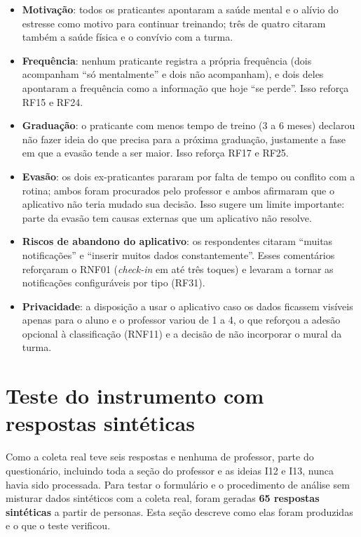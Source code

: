 \begin{itemize}
  \item \textbf{Motivação}: todos os praticantes apontaram a saúde mental
        e o alívio do estresse como motivo para continuar treinando; três
        de quatro citaram também a saúde física e o convívio com a turma.
  \item \textbf{Frequência}: nenhum praticante registra a própria
        frequência (dois acompanham ``só mentalmente'' e dois não
        acompanham), e dois deles apontaram a frequência como a
        informação que hoje ``se perde''. Isso reforça RF15 e RF24.
  \item \textbf{Graduação}: o praticante com menos tempo de treino (3 a 6
        meses) declarou não fazer ideia do que precisa para a próxima
        graduação, justamente a fase em que a evasão tende a ser maior.
        Isso reforça RF17 e RF25.
  \item \textbf{Evasão}: os dois ex-praticantes pararam por falta de tempo
        ou conflito com a rotina; ambos foram procurados pelo professor e
        ambos afirmaram que o aplicativo não teria mudado sua decisão.
        Isso sugere um limite importante: parte da evasão tem causas
        externas que um aplicativo não resolve.
  \item \textbf{Riscos de abandono do aplicativo}: os respondentes citaram
        ``muitas notificações'' e ``inserir muitos dados constantemente''.
        Esses comentários reforçaram o RNF01 (\textit{check-in} em até três
        toques) e levaram a tornar as notificações configuráveis por tipo
        (RF31).
  \item \textbf{Privacidade}: a disposição a usar o aplicativo caso os
        dados ficassem visíveis apenas para o aluno e o professor variou
        de 1 a 4, o que reforçou a adesão opcional à classificação (RNF11)
        e a decisão de não incorporar o mural da turma.
\end{itemize}

\section{Teste do instrumento com respostas sintéticas}
\label{sec:val-personas}

Como a coleta real teve seis respostas e nenhuma de professor, parte do
questionário, incluindo toda a seção do professor e as ideias I12 e I13,
nunca havia sido processada. Para testar o formulário e o procedimento de
análise sem misturar dados sintéticos com a coleta real, foram geradas
\textbf{65 respostas sintéticas} a partir de personas. Esta seção
descreve como elas foram produzidas e o que o teste verificou.


